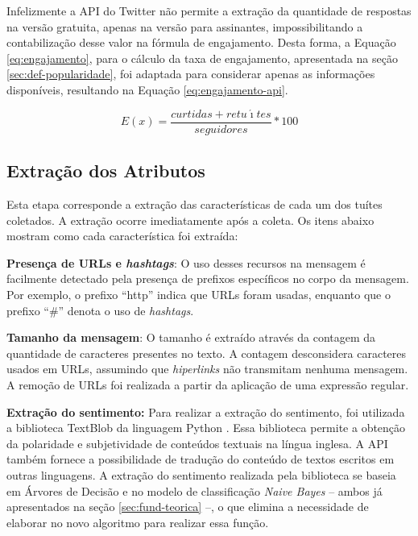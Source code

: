 \documentclass[oneside,openright,12pt]{ufsm_2015} %
\begin{document}
    \par Infelizmente a API do Twitter não permite a extração da quantidade de respostas na versão gratuita, apenas na versão para assinantes, impossibilitando a contabilização desse valor na fórmula de engajamento. Desta forma, a Equação \ref{eq:engajamento}, para o cálculo da taxa de engajamento, apresentada na seção \ref{sec:def-popularidade}, foi adaptada para considerar apenas as informações disponíveis, resultando na Equação \ref{eq:engajamento-api}.
    
    \begin{equation} \label{eq:engajamento-api}
    E(x) = \frac{curtidas + retu\acute{\imath}tes}{seguidores}*100
    \end{equation}


\subsection{Extração dos Atributos}

    \par Esta etapa corresponde a extração das características de cada um dos tuítes coletados. A extração ocorre imediatamente após a coleta. Os itens abaixo mostram como cada característica foi extraída:
    
    \par \textbf{Presença de URLs e \textit{hashtags}}: O uso desses recursos na mensagem é facilmente detectado pela presença de prefixos específicos no corpo da mensagem. Por exemplo, o prefixo ``http'' indica que URLs foram usadas, enquanto que o prefixo ``\#'' denota o uso de \textit{hashtags}. 
    
    \par \textbf{Tamanho da mensagem}: O tamanho é extraído através da contagem da quantidade de caracteres presentes no texto. A contagem desconsidera caracteres usados em URLs, assumindo que \textit{hiperlinks} não transmitam nenhuma mensagem.  A remoção de URLs foi realizada a partir da aplicação de uma expressão regular.

    \par \textbf{Extração do sentimento:} Para realizar a extração do sentimento, foi utilizada a biblioteca TextBlob da linguagem Python \cite{loria:14}. Essa biblioteca  permite a obtenção da polaridade e subjetividade de conteúdos textuais na língua inglesa. A API também fornece a possibilidade de tradução do conteúdo de textos escritos em outras linguagens. A extração do sentimento realizada pela biblioteca se baseia em Árvores de Decisão e no modelo de classificação \textit{Naive Bayes} -- ambos já apresentados na seção \ref{sec:fund-teorica} --, o que elimina a necessidade de elaborar no novo algoritmo para realizar essa função. 
\end{document}
